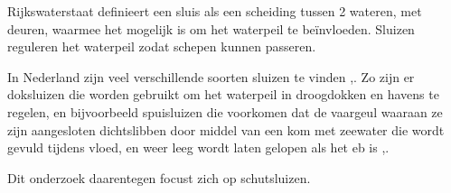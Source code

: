 \documentclass[../verslag.tex]{subfiles}
\begin{document}
Rijkswaterstaat definieert een sluis als een scheiding tussen 2 wateren, met deuren, waarmee het mogelijk is om het waterpeil te beïnvloeden. Sluizen reguleren het waterpeil zodat schepen kunnen passeren. \cite{rws_2022}

In Nederland zijn veel verschillende soorten sluizen te vinden \cite{wsnoorderzijlvest_2021},\cite{arends_1994}. Zo zijn er doksluizen die worden gebruikt om het waterpeil in droogdokken en havens te regelen, en bijvoorbeeld spuisluizen die voorkomen dat de vaargeul waaraan ze zijn aangesloten dichtslibben door middel van een kom met zeewater die wordt gevuld tijdens vloed, en weer leeg wordt laten gelopen als het eb is \cite{wsnoorderzijlvest_2021},\cite{arends_1994}.

Dit onderzoek daarentegen focust zich op schutsluizen. 
\end{document}

